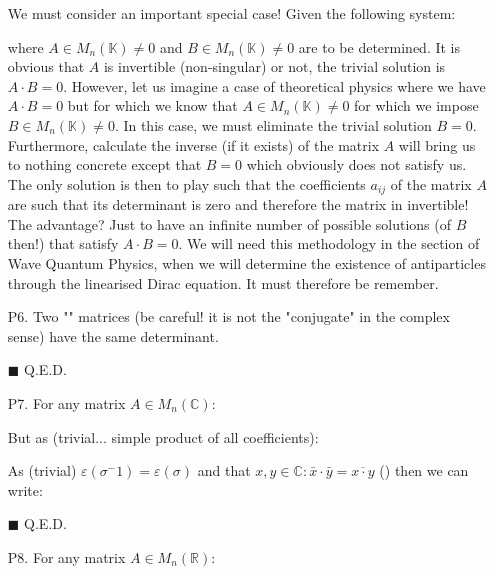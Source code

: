 \begin{enumerate}
		We must consider an important special case! Given the following system:
		
		where $A\in M_n(\mathbb{K})\neq 0$ and $B\in M_n(\mathbb{K})\neq 0$ are to be determined. It is obvious that $A$ is invertible (non-singular) or not, the trivial solution is $A\cdot B=0$. However, let us imagine a case of theoretical physics where we have $A\cdot B=0$ but for which we know that $A\in M_n(\mathbb{K})\neq 0$ for which we impose $B\in M_n(\mathbb{K})\neq 0$. In this case, we must eliminate the trivial solution $B=0$. Furthermore, calculate the inverse (if it exists) of the matrix $A$ will bring us to nothing concrete except that $B=0$ which obviously does not satisfy us. The only solution is then to play such that the coefficients $a_{ij}$ of the matrix $A$ are such that its determinant is zero and therefore the matrix in invertible! The advantage? Just to have an infinite number of possible solutions (of $B$ then!) that satisfy $A\cdot B=0$. We will need this methodology in the section of Wave Quantum Physics, when we will determine the existence of antiparticles through the linearised Dirac equation. It must therefore be remember.
		
		\item[P6.] Two "" matrices (be careful! it is not the "conjugate" in the complex sense) have the same determinant.
		\begin{dem}
		
		
		\begin{flushright}
			$\blacksquare$  Q.E.D.
		\end{flushright}
		\end{dem}
		
		\item[P7.] For any matrix $A\in M_n(\mathbb{C})$:
		\begin{dem}
		
		But as (trivial... simple product of all coefficients):
		
		As (trivial) $\varepsilon(\sigma^-1)=\varepsilon(\sigma)$ and that $x,y\in\mathbb{C}:\bar{x}\cdot \bar{y}=\overline{x\cdot y}$ () then we can write:
		
		\begin{flushright}
			$\blacksquare$  Q.E.D.
		\end{flushright}
		\end{dem}
		
		\item[P8.] For any matrix $A\in M_n(\mathbb{R})$:
		

\end{enumerate}
